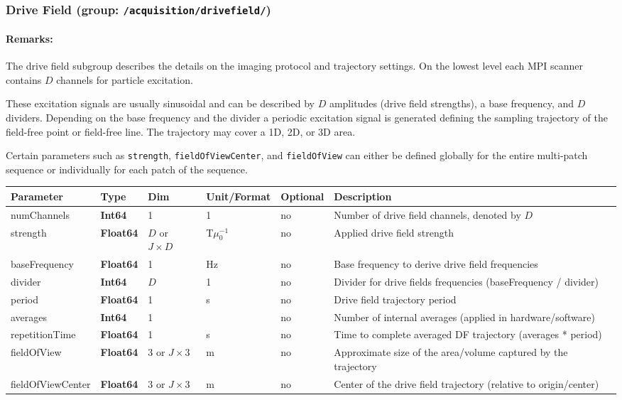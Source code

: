 \documentclass[landscape]{article} %
\newcommand{\inl}[1]{\lstinline[columns=fixed]{#1}}
\newcommand{\inltab}[1]{{\ttfamily\bfseries\color{blue}#1}}
\newcommand{\inlvar}[1]{{\ttfamily#1}}
\begin{document}
\subsubsection{Drive Field (group: \inl{/acquisition/drivefield/})}

\begin{multicols}{2}

\paragraph{Remarks:} The drive field subgroup describes the details on the imaging protocol and trajectory settings. On the lowest level each MPI scanner contains $D$ channels for particle excitation.

These excitation signals are usually sinusoidal and can be described by $D$ amplitudes (drive field strengths), a base frequency, and $D$ dividers. Depending on the base frequency and the divider a periodic excitation signal is generated defining the sampling trajectory of the field-free point or field-free line. The trajectory may cover a 1D, 2D, or 3D area.

Certain parameters such as \inl{strength}, \inl{fieldOfViewCenter}, and \inl{fieldOfView} can either be defined globally for the entire multi-patch sequence or individually for each patch of the sequence.

\end{multicols}


\noindent \begin{tabularx}{\columnwidth}{lllllX} 
\textbf{Parameter} & \textbf{Type} & \textbf{Dim} & \textbf{Unit/Format} & \textbf{Optional} & \textbf{Description} \\ \hline 
\inlvar{numChannels} & \inltab{Int64} & 1 & 1 & no & Number of drive field channels, denoted by $D$ \\ \hline
\inlvar{strength} & \inltab{Float64} & $D$ or $J \times D$ & T$\mu_0^{-1}$ & no & Applied drive field strength \\ \hline
\inlvar{baseFrequency} & \inltab{Float64} & 1 & Hz & no & Base frequency to derive drive field frequencies \\ \hline
\inlvar{divider} & \inltab{Int64} & $D$ & 1 & no & Divider for drive fields frequencies (\inlvar{baseFrequency} / \inlvar{divider}) \\ \hline
\inlvar{period} & \inltab{Float64} & 1 & s & no & Drive field trajectory period \\ \hline
\inlvar{averages} & \inltab{Int64} & 1 & & no & Number of internal averages (applied in hardware/software) \\ \hline
\inlvar{repetitionTime} & \inltab{Float64} & 1 & s & no & Time to complete averaged DF trajectory (averages * period)\\ \hline
\inlvar{fieldOfView} & \inltab{Float64} & 3 or $J\times 3$ & m & no & Approximate size of the area/volume captured by the trajectory \\ \hline
\inlvar{fieldOfViewCenter} & \inltab{Float64} & 3 or $J \times 3$ & m & no & Center of the drive field trajectory (relative to origin/center) \\ \hline
\end{tabularx}
\end{document}
